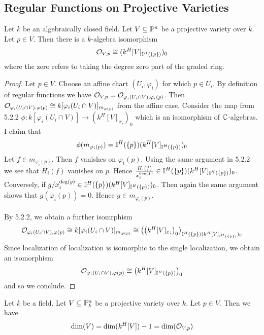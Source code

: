 \documentclass[a4paper]{article}
\begin{document}
\subsection{Regular Functions on Projective Varieties}
\begin{prp}{}{} Let $k$ be an algebraically closed field. Let $V\subseteq\mathbb{P}^n$ be a projective variety over $k$. Let $p\in V$. Then there is a $k$-algebra isomorphism $$\mathcal{O}_{V,p}\cong(k^H[V]_{\mathbb{I}^H(\{p\})})_0$$ where the zero refers to taking the degree zero part of the graded ring. \tcbline
\begin{proof}
Let $p\in V$. Choose an affine chart $(U_i,\varphi_i)$ for which $p\in U_i$. By definition of regular functions we have $\mathcal{O}_{V,p}=\mathcal{O}_{\varphi_i(U_i\cap V),\varphi_i(p)}$.  Then $\mathcal{O}_{\varphi_i(U_i\cap V),\varphi(p)}\cong k[\varphi_i(U_i\cap V)]_{m_{\varphi(p)}}$ from the affine case. Consider the map from 5.2.2 $\phi:k[\varphi_i(U_i\cap V)]\to (k^H[V]_{x_i})_0$ which is an isomorphism of $\mathbb{C}$-algebras. I claim that $$\phi(m_{\varphi_i(p)})=\mathbb{I}^H(\{p\})(k^H[V]_{\mathbb{I}^H(\{p\})})_0$$ Let $f\in m_{\varphi_i(p)}$. Then $f$ vanishes on $\varphi_i(p)$. Using the same argument in 5.2.2 we see that $H_i(f)$ vanishes on $p$. Hence $\frac{H_i(f)}{x_i^{\deg(f)}}\in\mathbb{I}^H(\{p\})(k^H[V]_{\mathbb{I}^H(\{p\})})_0$. Conversely, if $g/x_i^{\deg(g)}\in\mathbb{I}^H(\{p\})(k^H[V]_{\mathbb{I}^H(\{p\})})_0$. Then again the same argument shows that $g(\varphi_i(p))=0$. Hence $g\in m_{\varphi_i(p)}$. \\~\\

By 5.2.2, we obtain a further isomrphism $$\mathcal{O}_{\varphi_i(U_i\cap V),\varphi(p)}\cong k[\varphi_i(U_i\cap V)]_{m_{\varphi(p)}}\cong\left(\left(k^H[V]_{x_i}\right)_0\right)_{\mathbb{I}^H(\{p\})(k^H[V]_{\mathbb{I}^H(\{p\})})_0}$$ Since localization of localization is isomorphic to the single localization, we obtain an isomorphism $$\mathcal{O}_{\varphi_i(U_i\cap V),\varphi(p)}\cong\left(k^H[V]_{\mathbb{I}^H(\{p\})}\right)_0$$ and so we conclude. 
\end{proof}
\end{prp}

\begin{prp}{}{} Let $k$ be a field. Let $V\subseteq\mathbb{P}_k^n$ be a projective variety over $k$. Let $p\in V$. Then we have $$\dim(V)=\dim(k^H[V])-1=\dim(\mathcal{O}_{V,p})$$
\end{prp}
\end{document}
